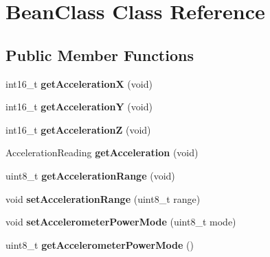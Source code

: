 \hypertarget{class_bean_class}{}\section{Bean\+Class Class Reference}
\label{class_bean_class}
\subsection*{Public Member Functions}
\begin{DoxyCompactItemize}
\item 
\hypertarget{class_bean_class_a00cf73de73eeb00d220efa32a830d6ef}{}int16\+\_\+t {\bfseries get\+Acceleration\+X} (void)\label{class_bean_class_a00cf73de73eeb00d220efa32a830d6ef}

\item 
\hypertarget{class_bean_class_aba0554ca18558748b67205bd5bdcaeac}{}int16\+\_\+t {\bfseries get\+Acceleration\+Y} (void)\label{class_bean_class_aba0554ca18558748b67205bd5bdcaeac}

\item 
\hypertarget{class_bean_class_a5c977e7b185ebc038335228d8ef1d0b9}{}int16\+\_\+t {\bfseries get\+Acceleration\+Z} (void)\label{class_bean_class_a5c977e7b185ebc038335228d8ef1d0b9}

\item 
\hypertarget{class_bean_class_ab286934ced898c9fd2ac12cfe43526f0}{}Acceleration\+Reading {\bfseries get\+Acceleration} (void)\label{class_bean_class_ab286934ced898c9fd2ac12cfe43526f0}

\item 
\hypertarget{class_bean_class_ad08dec6f240de8a53f110ddf066f6ab2}{}uint8\+\_\+t {\bfseries get\+Acceleration\+Range} (void)\label{class_bean_class_ad08dec6f240de8a53f110ddf066f6ab2}

\item 
\hypertarget{class_bean_class_acb8e9a741e2538393256f95d27c4571d}{}void {\bfseries set\+Acceleration\+Range} (uint8\+\_\+t range)\label{class_bean_class_acb8e9a741e2538393256f95d27c4571d}

\item 
\hypertarget{class_bean_class_a4eebb09ead4b598ef56c359ed14141be}{}void {\bfseries set\+Accelerometer\+Power\+Mode} (uint8\+\_\+t mode)\label{class_bean_class_a4eebb09ead4b598ef56c359ed14141be}

\item 
\hypertarget{class_bean_class_afb4f9a75f687547ff8f6cb4146ab30fa}{}uint8\+\_\+t {\bfseries get\+Accelerometer\+Power\+Mode} ()\label{class_bean_class_afb4f9a75f687547ff8f6cb4146ab30fa}


\end{DoxyCompactItemize}
